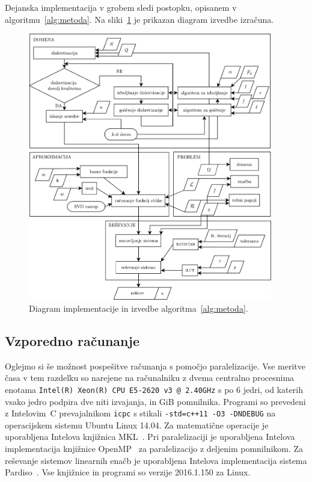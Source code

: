 \documentclass[12pt,a4paper,twoside]{article}
\theoremstyle{definition} %
\theoremstyle{plain} %
\numberwithin{equation}{section}
\newcommand{\CC}{C\nolinebreak\hspace{-.05em}\raisebox{.4ex}{\tiny\bf +}\nolinebreak\hspace{-.10em}\raisebox{.4ex}{\tiny\bf +}}
\begin{document}
Dejanska implementacija v grobem sledi postopku, opisanem v algoritmu~\ref{alg:metoda}. Na
sliki~\ref{fig:implementacija} je prikazan diagram izvedbe izračuna.

\begin{figure}[!h]
  \centering
  \vspace{-2ex}
  \includegraphics[width=0.95\textwidth]{images/diagram_finished.pdf}
  \vspace{-1ex}
  \caption[Diagram implementacije in izvedbe MLSM.]{Diagram implementacije in
  izvedbe algoritma~\ref{alg:metoda}.}
  \label{fig:implementacija}
  \vspace{-5ex}
\end{figure}

\subsection{Vzporedno računanje}
Oglejmo si še možnost pospešitve računanja s pomočjo paralelizacije.
Vse meritve časa v tem razdelku so narejene na računalniku z dvema centralno procesnima enotama
\texttt{Intel(R) Xeon(R) CPU E5-2620 v3 @ 2.40GHz} s po 6 jedri, od katerih vsako jedro podpira dve
niti izvajanja, in \unit[64]{GiB} pomnilnika. Programi so prevedeni z Intelovim~\CC{}
prevajalnikom \texttt{icpc}  s stikali \texttt{-std=c++11 -O3 -DNDEBUG}
na operacijskem sistemu Ubuntu Linux 14.04. Za matematične operacije je uporabljena Intelova
knjižnica MKL~\cite{mkl}. Pri paralelizaciji je uporabljena Intelova implementacija knjižnice
OpenMP~\cite{dagum1998openmp} za paralelizacijo z deljenim pomnilnikom. Za reševanje sistemov
linearnih enačb je uporabljena Intelova implementacija sistema Pardiso~\cite{pardiso}. Vse
knjižnice in programi so verzije 2016.1.150 za Linux.
\end{document}
